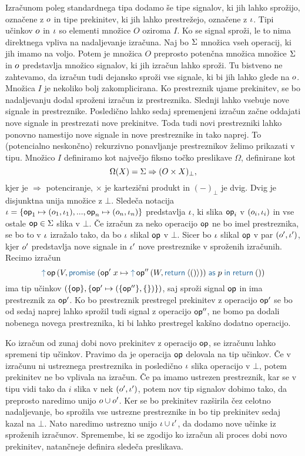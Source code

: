 Izračunom poleg standardnega tipa dodamo še tipe signalov, ki jih lahko sprožijo, označene z $o$ in tipe prekinitev, ki jih lahko prestrežejo, označene z $\iota$.
Tipi učinkov $o$ in $\iota$ so elementi množice $O$ oziroma $I$.
Ko se signal sproži, le to nima direktnega vpliva na nadaljevanje izračuna. Naj bo $\Sigma$ množica vseh operacij, ki jih imamo na voljo. Potem je množica $O$ preprosto potenčna množica množice $\Sigma$ in $o$ predstavlja množico signalov, ki jih izračun lahko sproži. Tu bistveno ne zahtevamo, da izračun tudi dejansko sproži vse signale, ki bi jih lahko glede na $o$.  
Množica $I$ je nekoliko bolj zakomplicirana. Ko prestreznik ujame prekinitev, se bo nadaljevanju dodal sproženi izračun iz prestreznika. Slednji lahko vsebuje nove signale in prestreznike. Posledično lahko sedaj spremenjeni izračun začne oddajati nove signale in prestrezati nove prekinitve. Toda tudi novi prestrezniki lahko ponovno namestijo nove signale in nove prestreznike in tako naprej.
To (potencialno neskončno) rekurzivno ponavljanje prestreznikov želimo prikazati v tipu.
Množico $I$ definiramo kot največjo fiksno točko preslikave $\Omega$, definirane kot 
$$\Omega(X) = \Sigma \Rightarrow (O \times X)_\bot ,$$
kjer je $\Rightarrow$ potenciranje, $\times$ je kartezični produkt in $(-)_\bot$ je dvig. Dvig je disjunktna unija množice z $\bot$.
Sledeča notacija $\iota = \{\mathsf{op}_1 \mapsto (o_1,\iota_1),...,\mathsf{op}_n \mapsto (o_n, \iota_n)\}$ predstavlja $\iota$, ki slika $\mathsf{op}_i$ v $(o_i, \iota_i)$ in vse ostale $\mathsf{op} \in \Sigma$ slika v $\bot$.
Če izračun za neko operacijo $\mathsf{op}$ ne bo imel prestreznika, se bo to v $\iota$ izražalo tako, da bo $\iota$ slikal $\mathsf{op}$ v $\bot$. 
Sicer bo $\iota$ slikal $\mathsf{op}$ v par $(o', \iota')$, kjer $o'$ predstavlja nove signale in $\iota'$ nove prestreznike v sproženih izračunih.
Recimo izračun $$\tmopout{op}{V}{\tmwith{op'}{x}{\tmopout{op''}{W}{\tmreturn{\tmpromise{()}}}}{p}{\tmreturn{()}}}$$ ima tip učinkov $(\{\mathsf{op}\}, \{\mathsf{op}' \mapsto (\{\mathsf{op}''\},\{\})\})$, saj sproži signal $\mathsf{op}$ in ima prestreznik za $\mathsf{op}'$. Ko bo prestreznik prestregel prekinitev z operacijo $\mathsf{op}'$ se bo od sedaj naprej lahko sprožil tudi signal z operacijo $\mathsf{op}''$, ne bomo pa dodali nobenega novega prestreznika, ki bi lahko prestregel kakšno dodatno operacijo.

Ko izračun od zunaj dobi novo prekinitev z operacijo $\mathsf{op}$, se izračunu lahko spremeni tip učinkov. Pravimo da je operacija $\mathsf{op}$ delovala na tip učinkov.
Če v izračunu ni ustreznega prestreznika in posledično $\iota$ slika operacijo v $\bot$, potem prekinitev ne bo vplivala na izračun.
Če pa imamo ustrezen prestreznik, kar se v tipu vidi tako da $i$ slika v nek $(o',\iota')$, potem nov tip signalov dobimo tako, da preprosto naredimo unijo $o \cup o'$. Ker se bo prekinitev razširila čez celotno nadaljevanje, bo sprožila vse ustrezne prestreznike in bo tip prekinitev sedaj kazal na $\bot$.
Nato naredimo ustrezno unijo $\iota \cup \iota'$, da dodamo nove učinke iz sproženih izračunov.
Spremembe, ki se zgodijo ko izračun ali proces dobi novo prekinitev, natančneje definira sledeča preslikava.

